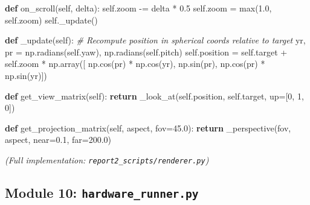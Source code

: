 \documentclass[
  11pt,
]{report}
\newenvironment{Shaded}{}{}
\newcommand{\BuiltInTok}[1]{\textcolor[rgb]{0.00,0.50,0.00}{#1}}
\newcommand{\CommentTok}[1]{\textcolor[rgb]{0.38,0.63,0.69}{\textit{#1}}}
\newcommand{\ControlFlowTok}[1]{\textcolor[rgb]{0.00,0.44,0.13}{\textbf{#1}}}
\newcommand{\DecValTok}[1]{\textcolor[rgb]{0.25,0.63,0.44}{#1}}
\newcommand{\FloatTok}[1]{\textcolor[rgb]{0.25,0.63,0.44}{#1}}
\newcommand{\KeywordTok}[1]{\textcolor[rgb]{0.00,0.44,0.13}{\textbf{#1}}}
\newcommand{\NormalTok}[1]{#1}
\newcommand{\OperatorTok}[1]{\textcolor[rgb]{0.40,0.40,0.40}{#1}}
\newcommand{\VariableTok}[1]{\textcolor[rgb]{0.10,0.09,0.49}{#1}}
\begin{document}
\begin{Shaded}
\begin{Highlighting}[]
    \KeywordTok{def}\NormalTok{ on\_scroll(}\VariableTok{self}\NormalTok{, delta):}
        \VariableTok{self}\NormalTok{.zoom }\OperatorTok{{-}=}\NormalTok{ delta }\OperatorTok{*} \FloatTok{0.5}
        \VariableTok{self}\NormalTok{.zoom }\OperatorTok{=} \BuiltInTok{max}\NormalTok{(}\FloatTok{1.0}\NormalTok{, }\VariableTok{self}\NormalTok{.zoom)}
        \VariableTok{self}\NormalTok{.\_update()}

    \KeywordTok{def}\NormalTok{ \_update(}\VariableTok{self}\NormalTok{):}
        \CommentTok{\# Recompute position in spherical coords relative to target}
\NormalTok{        yr, pr }\OperatorTok{=}\NormalTok{ np.radians(}\VariableTok{self}\NormalTok{.yaw), np.radians(}\VariableTok{self}\NormalTok{.pitch)}
        \VariableTok{self}\NormalTok{.position }\OperatorTok{=} \VariableTok{self}\NormalTok{.target }\OperatorTok{+} \VariableTok{self}\NormalTok{.zoom }\OperatorTok{*}\NormalTok{ np.array([}
\NormalTok{            np.cos(pr) }\OperatorTok{*}\NormalTok{ np.cos(yr), np.sin(pr), np.cos(pr) }\OperatorTok{*}\NormalTok{ np.sin(yr)])}

    \KeywordTok{def}\NormalTok{ get\_view\_matrix(}\VariableTok{self}\NormalTok{):}
        \ControlFlowTok{return}\NormalTok{ \_look\_at(}\VariableTok{self}\NormalTok{.position, }\VariableTok{self}\NormalTok{.target, up}\OperatorTok{=}\NormalTok{[}\DecValTok{0}\NormalTok{, }\DecValTok{1}\NormalTok{, }\DecValTok{0}\NormalTok{])}

    \KeywordTok{def}\NormalTok{ get\_projection\_matrix(}\VariableTok{self}\NormalTok{, aspect, fov}\OperatorTok{=}\FloatTok{45.0}\NormalTok{):}
        \ControlFlowTok{return}\NormalTok{ \_perspective(fov, aspect, near}\OperatorTok{=}\FloatTok{0.1}\NormalTok{, far}\OperatorTok{=}\FloatTok{200.0}\NormalTok{)}
\end{Highlighting}
\end{Shaded}

\emph{(Full implementation: \texttt{report2\_scripts/renderer.py})}

\subsection{\texorpdfstring{Module 10:
\texttt{hardware\_runner.py}}{Module 10: hardware\_runner.py}}\label{module-10-hardware_runner.py}
\end{document}
